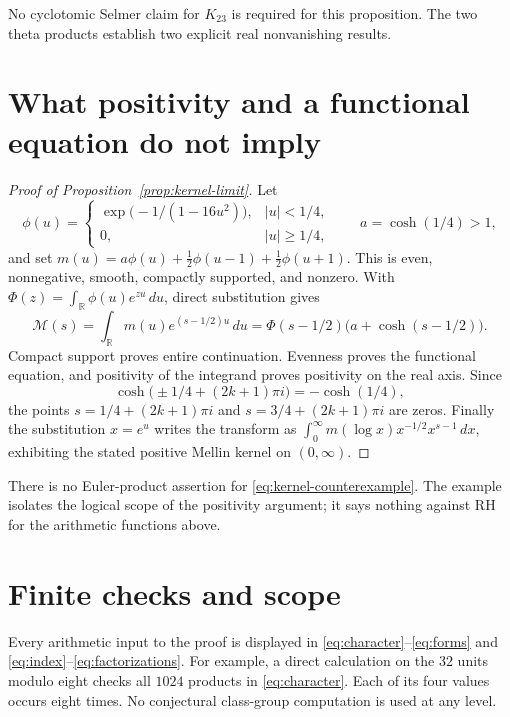 \documentclass[11pt]{article}
\begin{document}
No cyclotomic Selmer claim for $K_{23}$ is required for this proposition.
The two theta products establish two explicit real nonvanishing results.

\section{What positivity and a functional equation do not imply}


\begin{proof}[Proof of Proposition~\ref{prop:kernel-limit}]
Let
\[
 \phi(u)=
 \begin{cases}
  \exp\bigl(-1/(1-16u^2)\bigr),& |u|<1/4,\\
  0,& |u|\ge1/4,
 \end{cases}
 \qquad a=\cosh(1/4)>1,
\]
and set $m(u)=a\phi(u)+\tfrac12\phi(u-1)+\tfrac12\phi(u+1)$.
This is even, nonnegative, smooth, compactly supported, and nonzero.
With $\Phi(z)=\int_{\mathbb R}\phi(u)e^{zu}\,du$, direct substitution
gives
\[
 \mathcal M(s)=\int_{\mathbb R}m(u)e^{(s-1/2)u}\,du
  =\Phi(s-1/2)\bigl(a+\cosh(s-1/2)\bigr).
 \tag{38}\label{eq:kernel-counterexample}
\]
Compact support proves entire continuation. Evenness proves the
functional equation, and positivity of the integrand proves positivity
on the real axis. Since
\[
 \cosh\bigl(\pm1/4+(2k+1)\pi i\bigr)=-\cosh(1/4),
\]
the points $s=1/4+(2k+1)\pi i$ and $s=3/4+(2k+1)\pi i$ are zeros.
Finally the substitution $x=e^u$ writes the transform as
$\int_0^\infty m(\log x)x^{-1/2}x^{s-1}\,dx$, exhibiting the stated
positive Mellin kernel on $(0,\infty)$.
\end{proof}

There is no Euler-product assertion for \eqref{eq:kernel-counterexample}.
The example isolates the logical scope of the positivity argument;
it says nothing against RH for the arithmetic functions above.

\section{Finite checks and scope}

Every arithmetic input to the proof is displayed in
\eqref{eq:character}--\eqref{eq:forms} and
\eqref{eq:index}--\eqref{eq:factorizations}.
For example, a direct calculation on the $32$ units modulo eight
checks all $1024$ products in \eqref{eq:character}. Each of its four
values occurs eight times. No conjectural class-group computation is
used at any level.
\end{document}
